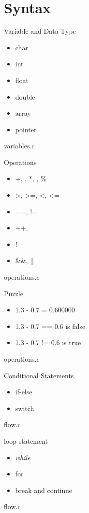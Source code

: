 \documentclass[UTF8]{beamer}
\begin{document}
\section{Syntax}
\begin{frame}[t]{Variable and Data Type}
    \begin{itemize}
        \item char
        \item int
        \item float
        \item double
        \item array
        \item pointer
    \end{itemize}
    variables.c
\end{frame}

\begin{frame}[t]{Operations}
    \begin{itemize}
        \item +, \-, *, \/, \%
        \item >, >=, <, <=
        \item ==, !=
        \item ++, \-\-
        \item !
        \item \&\&, ||
    \end{itemize}
    operations.c
\end{frame}

\begin{frame}[t]{Puzzle}
    \begin{itemize}
        \item 1.3 - 0.7 = 0.600000
        \item 1.3 - 0.7 == 0.6 is false
        \item 1.3 - 0.7 != 0.6 is true
    \end{itemize}
    operations.c
\end{frame}

\begin{frame}[t]{Conditional Statements}
    \begin{itemize}
        \item if-else
        \item switch
    \end{itemize}
    flow.c
\end{frame}

\begin{frame}[t]{loop statement}
    \begin{itemize}
        \item \textit{while}
        \item for
        \item break and continue
    \end{itemize}
    flow.c
\end{frame}
\end{document}
